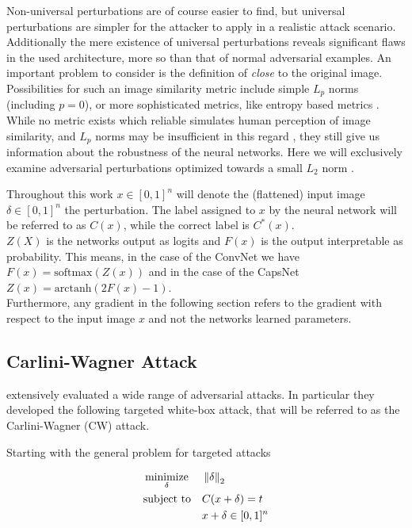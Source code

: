 Non-universal perturbations are of course easier to find, but universal perturbations are simpler for the attacker to apply in a realistic attack scenario. Additionally the mere existence of universal perturbations reveals significant flaws in the used architecture, more so than that of normal adversarial examples. 
An important problem to consider is the definition of \emph{close} to the original image. Possibilities for such an image similarity metric include simple $L_p$ norms (including $p=0$),
or more sophisticated metrics, like entropy based metrics .
While no metric exists which reliable simulates human perception of image similarity, and $L_p$ norms may be insufficient in this regard \citep{lpnorms}, they still give us information about the robustness of the neural networks. Here we will exclusively examine adversarial perturbations optimized towards a small $L_2$ norm .

Throughout this work $x \in [0,1]^n$ will denote the (flattened) input image $\delta \in [0,1]^n$ the perturbation.
The label assigned to $x$ by the neural network will be referred to as $C(x)$, while the correct label is $C^*(x)$.\\
$Z(X)$ is the networks output as logits and $F(x)$ is the output interpretable as probability.
This means, in the case of the ConvNet we have $F(x) = \mathrm{softmax}(Z(x))$ and in the case of the CapsNet $Z(x) = \mathrm{arctanh}(2F(x) - 1)$. \\
Furthermore, any gradient in the following section refers to the gradient with respect to the input image $x$ and not the networks learned parameters.



\subsection{Carlini-Wagner Attack}

\citet{carlini} extensively evaluated a wide range of adversarial attacks.
In particular they developed the following targeted white-box attack, that will be referred to as the Carlini-Wagner (CW) attack.

Starting with the general problem for targeted attacks

\begin{equation}
\begin{aligned}
& \operatorname*{minimize}_{\delta} && \left \lVert \delta \right \rVert _2 \\
& \text{subject to} && C(x + \delta) = t \\
& && x + \delta \in [0,1]^n
\end{aligned}
\end{equation}

